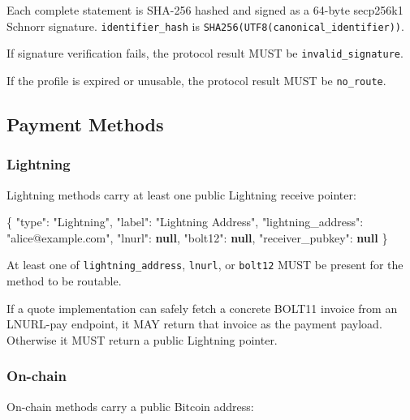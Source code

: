 \documentclass[
]{article}
\newenvironment{Shaded}{}{}
\newcommand{\DataTypeTok}[1]{\textcolor[rgb]{0.56,0.13,0.00}{#1}}
\newcommand{\FunctionTok}[1]{\textcolor[rgb]{0.02,0.16,0.49}{#1}}
\newcommand{\KeywordTok}[1]{\textcolor[rgb]{0.00,0.44,0.13}{\textbf{#1}}}
\newcommand{\StringTok}[1]{\textcolor[rgb]{0.25,0.44,0.63}{#1}}
\begin{document}
Each complete statement is SHA-256 hashed and signed as a 64-byte
secp256k1 Schnorr signature. \texttt{identifier\_hash} is
\texttt{SHA256(UTF8(canonical\_identifier))}.

If signature verification fails, the protocol result MUST be
\texttt{invalid\_signature}.

If the profile is expired or unusable, the protocol result MUST be
\texttt{no\_route}.

\hypertarget{payment-methods}{%
\subsection{Payment Methods}\label{payment-methods}}

\hypertarget{lightning}{%
\subsubsection{Lightning}\label{lightning}}

Lightning methods carry at least one public Lightning receive pointer:

\begin{Shaded}
\begin{Highlighting}[]
\FunctionTok{\{}
  \DataTypeTok{"type"}\FunctionTok{:} \StringTok{"Lightning"}\FunctionTok{,}
  \DataTypeTok{"label"}\FunctionTok{:} \StringTok{"Lightning Address"}\FunctionTok{,}
  \DataTypeTok{"lightning\_address"}\FunctionTok{:} \StringTok{"alice@example.com"}\FunctionTok{,}
  \DataTypeTok{"lnurl"}\FunctionTok{:} \KeywordTok{null}\FunctionTok{,}
  \DataTypeTok{"bolt12"}\FunctionTok{:} \KeywordTok{null}\FunctionTok{,}
  \DataTypeTok{"receiver\_pubkey"}\FunctionTok{:} \KeywordTok{null}
\FunctionTok{\}}
\end{Highlighting}
\end{Shaded}

At least one of \texttt{lightning\_address}, \texttt{lnurl}, or
\texttt{bolt12} MUST be present for the method to be routable.

If a quote implementation can safely fetch a concrete BOLT11 invoice
from an LNURL-pay endpoint, it MAY return that invoice as the payment
payload. Otherwise it MUST return a public Lightning pointer.

\hypertarget{on-chain}{%
\subsubsection{On-chain}\label{on-chain}}

On-chain methods carry a public Bitcoin address:
\end{document}
